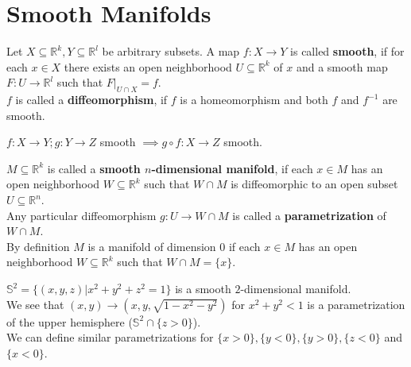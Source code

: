 \section{Smooth Manifolds}
\begin{definition}\label{4.1}
    Let $X\subseteq \mathbb{R}^k,Y\subseteq \mathbb{R}^l$ be arbitrary subsets. A map $f:X\to Y$ is called \textbf{smooth}, if for each $x\in X$ 
    there exists an open neighborhood $U\subseteq \mathbb{R}^k$ of $x$ and a smooth map $F:U\to \mathbb{R}^l$ such that $F|_{U\cap X}=f$.\\
    $f$ is called a \textbf{diffeomorphism}, if $f$ is a homeomorphism and both $f$ and $f^{-1}$ are smooth.\\  
\end{definition}
\begin{proposition}\label{4.2}
    $f:X\to Y;g:Y\to Z$ smooth $\implies g\circ f:X\to Z$ smooth.\\
\end{proposition}
\begin{definition}\label{4.3}
    $M\subseteq \mathbb{R}^k$ is called a \textbf{smooth $n$-dimensional manifold}, if each $x\in M$ has an open neighborhood 
    $W\subseteq \mathbb{R}^k$ such that $W\cap M$ is diffeomorphic to an open subset $U\subseteq \mathbb{R}^n$.\\
    Any particular diffeomorphism $g:U\to W\cap M$ is called a \textbf{parametrization} of $W\cap M$. \\
    By definition $M$ is a manifold of dimension $0$ if each $x\in M$ has an open neighborhood $W\subseteq \mathbb{R}^k$ such that $W\cap M=\{x\}$.  
\end{definition}
\begin{example}\label{4.4}
    $\mathbb{S}^2=\{(x,y,z)|x^2+y^2+z^2=1\}$ is a smooth $2$-dimensional manifold.\\
    We see that $(x,y)\to(x,y,\sqrt{1-x^2-y^2})$ for $x^2+y^2<1$ is a parametrization of the upper hemisphere ($\mathbb{S}^2\cap\{z>0\}$).\\
    We can define similar parametrizations for $\{x>0\},\{y<0\},\{y>0\},\{z<0\}$ and $\{x<0\}$.\\ 
\end{example}
